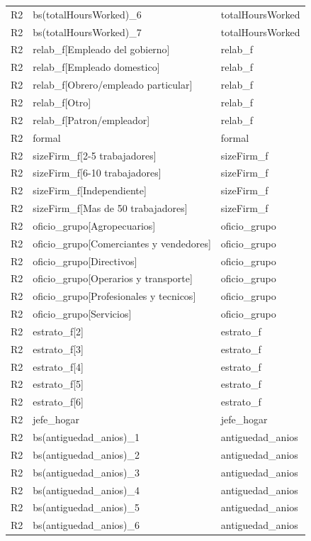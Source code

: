 \begin{longtable}{lll}
R2 & bs(totalHoursWorked)\_6 & totalHoursWorked \\
R2 & bs(totalHoursWorked)\_7 & totalHoursWorked \\
R2 & relab\_f[Empleado del gobierno] & relab\_f \\
R2 & relab\_f[Empleado domestico] & relab\_f \\
R2 & relab\_f[Obrero/empleado particular] & relab\_f \\
R2 & relab\_f[Otro] & relab\_f \\
R2 & relab\_f[Patron/empleador] & relab\_f \\
R2 & formal & formal \\
R2 & sizeFirm\_f[2-5 trabajadores] & sizeFirm\_f \\
R2 & sizeFirm\_f[6-10 trabajadores] & sizeFirm\_f \\
R2 & sizeFirm\_f[Independiente] & sizeFirm\_f \\
R2 & sizeFirm\_f[Mas de 50 trabajadores] & sizeFirm\_f \\
R2 & oficio\_grupo[Agropecuarios] & oficio\_grupo \\
R2 & oficio\_grupo[Comerciantes y vendedores] & oficio\_grupo \\
R2 & oficio\_grupo[Directivos] & oficio\_grupo \\
R2 & oficio\_grupo[Operarios y transporte] & oficio\_grupo \\
R2 & oficio\_grupo[Profesionales y tecnicos] & oficio\_grupo \\
R2 & oficio\_grupo[Servicios] & oficio\_grupo \\
R2 & estrato\_f[2] & estrato\_f \\
R2 & estrato\_f[3] & estrato\_f \\
R2 & estrato\_f[4] & estrato\_f \\
R2 & estrato\_f[5] & estrato\_f \\
R2 & estrato\_f[6] & estrato\_f \\
R2 & jefe\_hogar & jefe\_hogar \\
R2 & bs(antiguedad\_anios)\_1 & antiguedad\_anios \\
R2 & bs(antiguedad\_anios)\_2 & antiguedad\_anios \\
R2 & bs(antiguedad\_anios)\_3 & antiguedad\_anios \\
R2 & bs(antiguedad\_anios)\_4 & antiguedad\_anios \\
R2 & bs(antiguedad\_anios)\_5 & antiguedad\_anios \\
R2 & bs(antiguedad\_anios)\_6 & antiguedad\_anios \\

\end{longtable}
